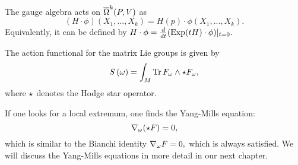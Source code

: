 The gauge algebra acts on $\overline{\Omega}^{k}(P, V)$ as $$(H \cdot \phi)(X_{1},...,X_{k})=H(p)\cdot \phi(X_{1},...,X_{k}).$$
Equivalently, it can be defined by $H\cdot \phi = \frac{d}{dt}(\operatorname{Exp}(tH)\cdot\phi)|_{t=0}.$

\begin{defn}
 \label{JB:6.2}
The action functional for the matrix Lie groups is given by
$$
S\left( \omega \right)= \int_{M} \operatorname{Tr} F_{\omega} \wedge \star F_{\omega},
$$
where $\star$ denotes the Hodge star operator.
\end{defn}

If one looks for a local extremum, one finds the Yang-Mills equation:
$$
\nabla_{\omega}(\star F)=0,
$$
which is similar to the Bianchi identity $\nabla_{\omega}F=0,$ which is always satisfied. We will discuss the Yang-Mills
equations in more detail in our next chapter.


